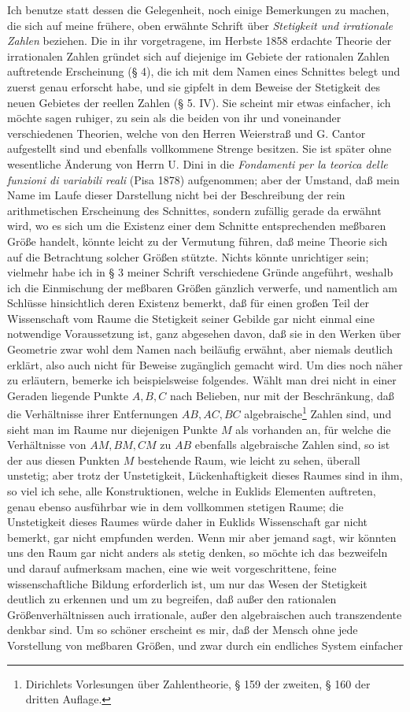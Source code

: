 \documentclass[11pt]{article}
\begin{document}
Ich benutze statt dessen die Gelegenheit, noch einige Bemerkungen zu machen, die sich auf meine frühere, oben erwähnte Schrift über \emph{Stetigkeit und irrationale Zahlen} beziehen. Die in ihr vorgetragene, im Herbste 1858 erdachte Theorie der irrationalen Zahlen gründet sich auf diejenige im Gebiete der rationalen Zahlen auftretende Erscheinung (§ 4), die ich mit dem Namen eines Schnittes belegt und zuerst genau erforscht habe, und sie gipfelt in dem Beweise der Stetigkeit des neuen Gebietes der reellen Zahlen (§ 5. IV). Sie scheint mir etwas einfacher, ich möchte sagen ruhiger, zu sein als die beiden von ihr und voneinander verschiedenen Theorien, welche von den Herren Weierstraß und G. Cantor aufgestellt sind und ebenfalls vollkommene Strenge besitzen. Sie ist später ohne wesentliche Änderung von Herrn U. Dini in die \emph{Fondamenti per la teorica delle funzioni di variabili reali} (Pisa 1878) aufgenommen; aber der Umstand, daß mein Name im Laufe dieser Darstellung nicht bei der Beschreibung der rein arithmetischen Erscheinung des Schnittes, sondern zufällig gerade da erwähnt wird, wo es sich um die Existenz einer dem Schnitte entsprechenden meßbaren Größe handelt, könnte leicht zu der Vermutung führen, daß meine Theorie sich auf die Betrachtung solcher Größen stützte. Nichts könnte unrichtiger sein; vielmehr habe ich in § 3 meiner Schrift verschiedene Gründe angeführt, weshalb ich die Einmischung der meßbaren Größen gänzlich verwerfe, und namentlich am Schlüsse hinsichtlich deren Existenz bemerkt, daß für einen großen Teil der Wissenschaft vom Raume die Stetigkeit seiner Gebilde gar nicht einmal eine notwendige Voraussetzung ist, ganz abgesehen davon, daß sie in den Werken über Geometrie zwar wohl dem Namen nach beiläufig erwähnt, aber niemals deutlich erklärt, also auch nicht für Beweise zugänglich gemacht wird. Um dies noch näher zu erläutern, bemerke ich beispielsweise folgendes. Wählt man drei nicht in einer Geraden liegende Punkte $A,B,C$ nach Belieben, nur mit der Beschränkung, daß die Verhältnisse ihrer Entfernungen $AB, AC, BC$ algebraische\footnote{Dirichlets Vorlesungen über Zahlentheorie, § 159 der zweiten, § 160 der dritten Auflage.} Zahlen sind, und sieht man im Raume nur diejenigen Punkte $M$ als vorhanden an, für welche die Verhältnisse von $AM, BM, CM$ zu $AB$ ebenfalls algebraische Zahlen sind, so ist der aus diesen Punkten $M$ bestehende Raum, wie leicht zu sehen, überall unstetig; aber trotz der Unstetigkeit, Lückenhaftigkeit dieses Raumes sind in ihm, so viel ich sehe, alle Konstruktionen, welche in Euklids Elementen auftreten, genau ebenso ausführbar wie in dem vollkommen stetigen Raume; die Unstetigkeit dieses Raumes würde daher in Euklids Wissenschaft gar nicht bemerkt, gar nicht empfunden werden. Wenn mir aber jemand sagt, wir könnten uns den Raum gar nicht anders als stetig denken, so möchte ich das bezweifeln und darauf aufmerksam machen, eine wie weit vorgeschrittene, feine wissenschaftliche Bildung erforderlich ist, um nur das Wesen der Stetigkeit deutlich zu erkennen und um zu begreifen, daß außer den rationalen Größenverhältnissen auch irrationale, außer den algebraischen auch transzendente denkbar sind. Um so schöner erscheint es mir, daß der Mensch ohne jede Vorstellung von meßbaren Größen, und zwar durch ein endliches System einfacher 
\end{document}
